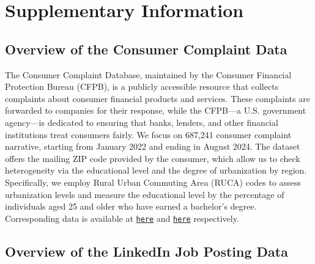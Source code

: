 \section*{Supplementary Information}



\subsection*{Overview of the Consumer Complaint Data}
\label{main:subsec:Consumer Complaint-data}

The Consumer Complaint Database, maintained by the Consumer Financial Protection Bureau (CFPB), is a publicly accessible resource that collects complaints about consumer financial products and services. These complaints are forwarded to companies for their response, while the CFPB—a U.S. government agency—is dedicated to ensuring that banks, lenders, and other financial institutions treat consumers fairly. We focus on 687,241 consumer complaint narrative, starting from January 2022 and ending in August 2024. The dataset offers the mailing ZIP code provided by the consumer, which allow us to check heterogeneity via the educational level and the degree of urbanization by region. Specifically, we employ Rural Urban Commuting Area (RUCA) codes to assess urbanization levels and measure the educational level by the percentage of individuals aged 25 and older who have earned a bachelor’s degree. Corresponding data is available at 
\href{https://www.ers.usda.gov/data-products/rural-urban-commuting-area-codes}{\texttt{here}}
and \href{https://data.census.gov/table/ACSST1Y2023.S1501}{\texttt{here}} respectively.


\subsection*{Overview of the LinkedIn Job Posting Data}
\label{main:subsec:job-posting-data}


